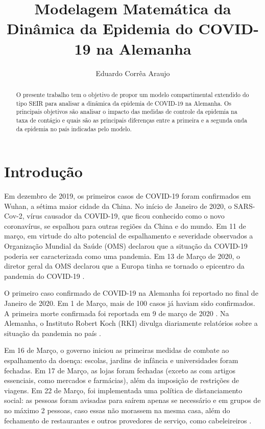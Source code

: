 \documentclass[12pt]{article}
\begin{document}
\date{}
\title{Modelagem Matemática da Dinâmica da Epidemia do COVID-19 na Alemanha}
\author{Eduardo Corrêa Araujo}
\maketitle

\begin{abstract}
    O presente trabalho tem o objetivo de propor um modelo compartimental extendido do tipo SEIR para analisar a dinâmica da epidemia de COVID-19 na Alemanha. Os principais objetivos são analisar o impacto das medidas de controle da epidemia na taxa de contágio e  quais são as principais diferenças entre a primeira e a segunda onda da epidemia no país indicadas pelo modelo.
\end{abstract}

\section{Introdução}

 Em dezembro de 2019, os primeiros casos de COVID-19 foram confirmados em Wuhan, a sétima maior cidade da China. No início de Janeiro de 2020, o SARS-Cov-2, vírus causador da COVID-19, que ficou conhecido como o novo coronavírus, se espalhou para outras regiões da China e do mundo. Em 11 de março, em virtude do alto potencial de espalhamento e severidade observados a Organização Mundial da Saúde (OMS) declarou que a situação da COVID-19 poderia ser caracterizada como uma pandemia. Em 13 de Março de 2020, o diretor geral da  OMS declarou que a Europa tinha se tornado o epicentro da pandemia do COVID-19 \cite{OMS}. 

O primeiro caso confirmado de COVID-19 na Alemanha foi reportado no final de Janeiro de 2020. Em 1 de Março, mais de 100 casos já haviam sido confirmados. A primeira morte confirmada foi reportada em 9 de março de 2020 \cite{goetz2020covid}. Na Alemanha, o Instituto Robert Koch (RKI) divulga diariamente relatórios sobre a situação da pandemia no país \cite{RKI}.

Em 16 de Março, o governo iniciou as primeiras medidas de combate ao espalhamento da doença: escolas, jardins de infância e universidades foram fechadas. Em 17 de Março, as lojas foram fechadas (exceto as com artigos essenciais, como mercados e farmácias), além da imposição de restrições de viagens. Em 22 de Março, foi implementada uma política de distanciamento social: as pessoas foram avisadas para saírem apenas se necessário e em grupos de no máximo 2 pessoas, caso essas não morassem na mesma casa, além do fechamento de restaurantes e outros provedores de serviço, como cabeleireiros \cite{goetz2020covid, wieland2020flatten}.
\end{document}
